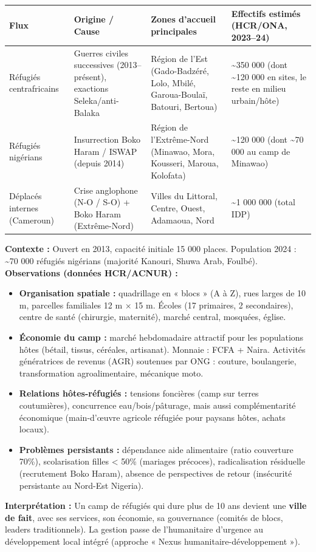 \documentclass[11pt]{article}
\begin{document}
\begin{center}
\begin{tabularx}{\linewidth}{|l|X|X|X|}\hline
\textbf{Flux} & \textbf{Origine / Cause} & \textbf{Zones d'accueil principales} & \textbf{Effectifs estimés (HCR/ONA, 2023--24)} \\ \hline
Réfugiés centrafricains & Guerres civiles successives (2013--présent), exactions Seleka/anti-Balaka & Région de l'Est (Gado-Badzéré, Lolo, Mbilé, Garoua-Boulaï, Batouri, Bertoua) & \num{~350 000} (dont \num{~120 000} en sites, le reste en milieu urbain/hôte) \\ \hline
Réfugiés nigérians & Insurrection Boko Haram / ISWAP (depuis 2014) & Région de l'Extrême-Nord (Minawao, Mora, Kousseri, Maroua, Kolofata) & \num{~120 000} (dont \num{~70 000} au camp de Minawao) \\ \hline
Déplacés internes (Cameroun) & Crise anglophone (N-O / S-O) + Boko Haram (Extrême-Nord) & Villes du Littoral, Centre, Ouest, Adamaoua, Nord & \num{~1 000 000} (total IDP) \\ \hline
\end{tabularx}
\end{center}

\begin{experience}
\textbf{Contexte :} Ouvert en 2013, capacité initiale 15 000 places. Population 2024 : \num{~70 000} réfugiés nigérians (majorité Kanouri, Shuwa Arab, Foulbé).
\textbf{Observations (données HCR/ACNUR) :}
\begin{itemize}
    \item \textbf{Organisation spatiale :} quadrillage en « blocs » (A à Z), rues larges de 10 m, parcelles familiales 12 m × 15 m. Écoles (17 primaires, 2 secondaires), centre de santé (chirurgie, maternité), marché central, mosquées, église.
    \item \textbf{Économie du camp :} marché hebdomadaire attractif pour les populations hôtes (bétail, tissus, céréales, artisanat). Monnaie : FCFA + Naira. Activités génératrices de revenus (AGR) soutenues par ONG : couture, boulangerie, transformation agroalimentaire, mécanique moto.
    \item \textbf{Relations hôtes-réfugiés :} tensions foncières (camp sur terres coutumières), concurrence eau/bois/pâturage, mais aussi complémentarité économique (main-d'œuvre agricole réfugiée pour paysans hôtes, achats locaux).
    \item \textbf{Problèmes persistants :} dépendance aide alimentaire (ratio couverture 70\%), scolarisation filles < 50\% (mariages précoces), radicalisation résiduelle (recrutement Boko Haram), absence de perspectives de retour (insécurité persistante au Nord-Est Nigeria).
\end{itemize}
\textbf{Interprétation :} Un camp de réfugiés qui dure plus de 10 ans devient une \textbf{ville de fait}, avec ses services, son économie, sa gouvernance (comités de blocs, leaders traditionnels). La gestion passe de l'humanitaire d'urgence au développement local intégré (approche « Nexus humanitaire-développement »).
\end{experience}
\end{document}
